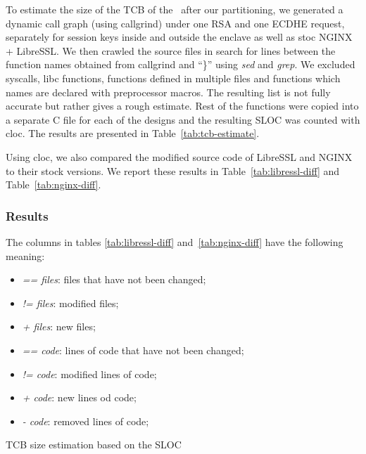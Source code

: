 \documentclass[../../../main.tex]{subfiles}
\begin{document}
\label{sec:tcb-analysis}
To estimate the size of the TCB of the \enclaveprogram~after our partitioning,
we generated a dynamic call graph (using callgrind) under one RSA and one ECDHE
request, separately for session keys inside and outside the enclave as well as
stoc NGINX + LibreSSL. We then crawled the source files in search for lines
between the function names obtained from callgrind and ``\}'' using
\textit{sed} and \textit{grep}. We excluded syscalls, libc functions,
functions defined in multiple files and functions which names are
declared with preprocessor macros. The resulting list is not fully accurate
but rather gives a rough estimate. Rest of the functions were copied into a
separate C file for each of the designs and the resulting SLOC was counted
with cloc. The results are presented in Table~\ref{tab:tcb-estimate}.

Using cloc, we also compared the modified source code of LibreSSL and NGINX to
their stock versions. We report these results in Table~\ref{tab:libressl-diff}
and Table~\ref{tab:nginx-diff}.

\subsubsection*{Results}
The columns in tables \ref{tab:libressl-diff} and~\ref{tab:nginx-diff} have
the following meaning:
\begin{itemize}
  \item \textit{\footnotesize == files}: files that have not been changed;
  \item \textit{\footnotesize != files}: modified files;
  \item \textit{\footnotesize + files}: new files;
  \item \textit{\footnotesize == code}: lines of code that have not been
    changed;
  \item \textit{\footnotesize != code}:  modified lines of code;
  \item \textit{\footnotesize + code}: new lines od code;
  \item \textit{\footnotesize - code}: removed lines of code;
\end{itemize}

\begin{table}[H]
  \center
  \footnotesize
  \caption{TCB size estimation based on the SLOC}
  \label{tab:tcb-estimate}
\end{table}
\end{document}
